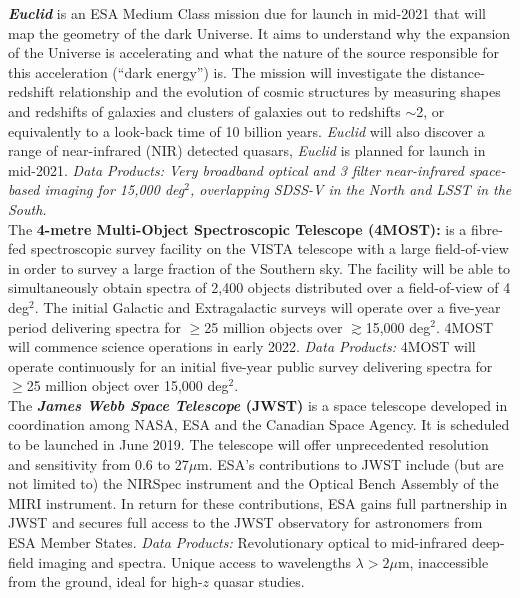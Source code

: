 \begin{framed}
\textit{\textbf{Euclid}} is an ESA Medium Class mission due for launch
in mid-2021 that will map the geometry of the dark Universe.  It aims
to understand why the expansion of the Universe is accelerating and
what the nature of the source responsible for this acceleration
(``dark energy'') is.  The mission will investigate the
distance-redshift relationship and the evolution of cosmic structures
by measuring shapes and redshifts of galaxies and clusters of galaxies
out to redshifts $\sim$2, or equivalently to a look-back time of 10
billion years. {\it Euclid} will also discover a range of
near-infrared (NIR) detected quasars, {\it Euclid} is planned for
launch in mid-2021.  {\it Data Products: Very broadband optical and 3
filter near-infrared space-based imaging for 15,000 deg$^2$, 
overlapping SDSS-V in the North and LSST in the South.} \\

The {\bf 4-metre Multi-Object Spectroscopic Telescope (4MOST):} is a
fibre-fed spectroscopic survey facility on the VISTA telescope with a
large field-of-view in order to survey a large fraction of the Southern
sky. The facility will be able to simultaneously obtain spectra of
2,400 objects distributed over a field-of-view of 4 deg$^{2}$.
The initial Galactic and Extragalactic surveys will operate over a
five-year period delivering spectra for $\geq$25 million objects over
$\gtrsim$15,000 deg$^{2}$. 4MOST will commence science operations in early
2022. {\it Data Products: } 4MOST will operate continuously for an
initial five-year public survey delivering spectra for $\geq$25
million object over 15,000 deg$^{2}$.\\

The \textbf{\emph{James Webb Space Telescope} (JWST)} is a space
telescope developed in coordination among NASA, ESA and the Canadian
Space Agency. It is scheduled to be launched in June 2019. The
telescope will offer unprecedented resolution and sensitivity from 0.6
to 27$\mu$m. ESA's contributions to JWST include (but are not limited
to) the NIRSpec instrument and the Optical Bench Assembly of the MIRI
instrument.  In return for these contributions, ESA gains full
partnership in JWST and secures full access to the JWST observatory
for astronomers from ESA Member States. {\it Data Products:}
Revolutionary optical to mid-infrared deep-field imaging and spectra.
Unique access to wavelengths $\lambda>2\mu$m, inaccessible from the
ground, ideal for high-$z$ quasar studies. \\



\end{framed}
